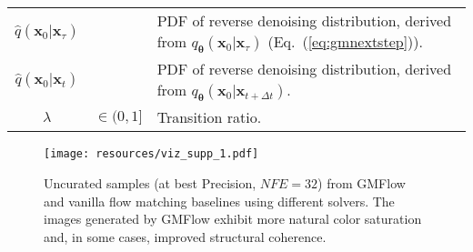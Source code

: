 \documentclass{article}
\def\vtheta{{\bm{\theta}}}
\def\vx{{\bm{x}}}
\theoremstyle{custom}
\theoremstyle{definition}
\theoremstyle{remark}
\begin{document}
\begin{table}[h]
\begin{center}
{\begin{tabular}{cll}
        $\hat{q}(\vx_0 | \vx_\tau)$ & & PDF of reverse denoising distribution, derived from $q_\vtheta(\vx_0 | \vx_\tau)$ (Eq.~(\ref{eq:gmnextstep})). \\
        $\hat{q}(\vx_0 | \vx_t)$ & & PDF of reverse denoising distribution, derived from $q_\vtheta(\vx_0 | \vx_{t + \Delta t})$. \\
        $\lambda$ & $\in (0, 1]$ & Transition ratio. \\
        \bottomrule
    \end{tabular}}
    \end{center}
\end{table}

\clearpage


\begin{figure*}[t]
\begin{center}
\texttt{[image: resources/viz\_supp\_1.pdf]}
\caption{Uncurated samples (at best Precision, $\mathit{NFE}=32$) from GMFlow and vanilla flow matching baselines using different solvers. The images generated by GMFlow exhibit more natural color saturation and, in some cases, improved structural coherence.
}
\label{fig:viz_supp_1}
\end{center}
\end{figure*} 
\end{document}
